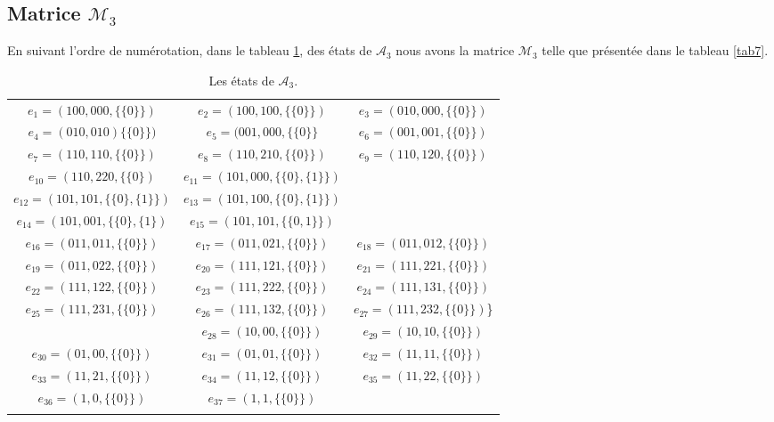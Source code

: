 \documentclass[12pt]{memoireuqam1.3}
\begin{document}
\normalsize
 \begin{spacing}{0.30}
\subsection*{Matrice $\mathcal{M}_{3}$}
 \end{spacing}
En suivant l'ordre de numérotation, dans le tableau \ref{tab6},  des états de $\mathcal{A}_{3}$ nous avons la matrice $\mathcal{M}_{3}$ telle que présentée dans le tableau \ref{tab7}.
\small
\begin{longtable}{|c|c|c|} 
\hline
$e_{1}=(100,000,\{\{0\}\})$&
$e_{2}=(100,100,\{\{0\}\})$&
$e_{3}=(010,000,\{\{0\}\})$\\
$e_{4}=(010,010)\{\{0\}\})$&
$e_{5}=(001,000,\{\{0\}\}$&
$e_{6}=(001,001,\{\{0\}\})$\\
$e_{7}=(110,110,\{\{0\}\})$&
$e_{8}=(110,210,\{\{0\}\})$&
$e_{9}=(110,120,\{\{0\}\})$\\
$e_{10}=(110,220,\{\{0\})$&
$e_{11}=(101,000,\{\{0\},\{1\}\})$& \\
$e_{12}=(101,101,\{\{0\},\{1\}\})$ &
$e_{13}=(101,100,\{\{0\},\{1\}\})$& \\
$e_{14}=(101,001,\{\{0\},\{1\})$&
$e_{15}=(101,101,\{\{0,1\}\})$ &\\
$e_{16}=(011,011,\{\{0\}\})$&
$e_{17}=(011,021,\{\{0\}\})$&
$e_{18}=(011,012,\{\{0\}\})$\\
$e_{19}=(011,022,\{\{0\}\})$&
$e_{20}=(111,121,\{\{0\}\})$&
$e_{21}=(111,221,\{\{0\}\})$\\
$e_{22}=(111,122,\{\{0\}\})$&
$e_{23}=(111,222,\{\{0\}\})$&
$e_{24}=(111,131,\{\{0\}\})$\\
$e_{25}=(111,231,\{\{0\}\})$&
$e_{26}=(111,132,\{\{0\}\})$&
$e_{27}=(111,232,\{\{0\}\})$\}\\
&
$e_{28}=(10,00,\{\{0\}\})$&
$e_{29}=(10,10,\{\{0\}\})$\\
$e_{30}=(01,00,\{\{0\}\})$&
$e_{31}=(01,01,\{\{0\}\})$&
$e_{32}=(11,11,\{\{0\}\})$\\
$e_{33}=(11,21,\{\{0\}\})$&
$e_{34}=(11,12,\{\{0\}\})$&
$e_{35}=(11,22,\{\{0\}\})$\\
$e_{36}=(1,0,\{\{0\}\})$ &
$e_{37}=(1,1,\{\{0\}\})$ & \\
\hline
\caption{\label{tab6} Les états de $\mathcal{A}_{3}$.}
\end{longtable}
\normalsize
\tiny
\end{document}

